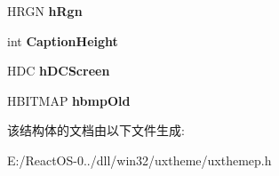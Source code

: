 \begin{DoxyCompactItemize}
H\+R\+GN {\bfseries h\+Rgn}
\item 
\mbox{\label{struct___d_r_a_w___c_o_n_t_e_x_t_aa9c0bfbc3dda0537466ee2d82e92e6ec}} 
int {\bfseries Caption\+Height}
\item 
\mbox{\label{struct___d_r_a_w___c_o_n_t_e_x_t_acaeb41d5550a66f6f4dc5e9a6f30c361}} 
H\+DC {\bfseries h\+D\+C\+Screen}
\item 
\mbox{\label{struct___d_r_a_w___c_o_n_t_e_x_t_a7bb936ce958a956b03fdcb42cd351536}} 
H\+B\+I\+T\+M\+AP {\bfseries hbmp\+Old}
\end{DoxyCompactItemize}


该结构体的文档由以下文件生成\+:\begin{DoxyCompactItemize}
\item 
E\+:/\+React\+O\+S-\/0../dll/win32/uxtheme/uxthemep.\+h\end{DoxyCompactItemize}
